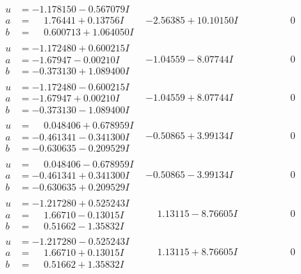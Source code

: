 \documentclass[1p]{elsarticle_modified}
\theoremstyle{definition}
\begin{document}
$$\begin{array}{c|c|c}
\begin{aligned}
u &= -1.178150 - 0.567079 I \\
a &= \phantom{-}1.76441 + 0.13756 I \\
b &= \phantom{-}0.600713 + 1.064050 I\end{aligned}
 & -2.56385 + 10.10150 I & \phantom{-0.000000 } 0 \\ \hline\begin{aligned}
u &= -1.172480 + 0.600215 I \\
a &= -1.67947 - 0.00210 I \\
b &= -0.373130 + 1.089400 I\end{aligned}
 & -1.04559 - 8.07744 I & \phantom{-0.000000 } 0 \\ \hline\begin{aligned}
u &= -1.172480 - 0.600215 I \\
a &= -1.67947 + 0.00210 I \\
b &= -0.373130 - 1.089400 I\end{aligned}
 & -1.04559 + 8.07744 I & \phantom{-0.000000 } 0 \\ \hline\begin{aligned}
u &= \phantom{-}0.048406 + 0.678959 I \\
a &= -0.461341 - 0.341300 I \\
b &= -0.630635 - 0.209529 I\end{aligned}
 & -0.50865 + 3.99134 I & \phantom{-0.000000 } 0 \\ \hline\begin{aligned}
u &= \phantom{-}0.048406 - 0.678959 I \\
a &= -0.461341 + 0.341300 I \\
b &= -0.630635 + 0.209529 I\end{aligned}
 & -0.50865 - 3.99134 I & \phantom{-0.000000 } 0 \\ \hline\begin{aligned}
u &= -1.217280 + 0.525243 I \\
a &= \phantom{-}1.66710 - 0.13015 I \\
b &= \phantom{-}0.51662 - 1.35832 I\end{aligned}
 & \phantom{-}1.13115 - 8.76605 I & \phantom{-0.000000 } 0 \\ \hline\begin{aligned}
u &= -1.217280 - 0.525243 I \\
a &= \phantom{-}1.66710 + 0.13015 I \\
b &= \phantom{-}0.51662 + 1.35832 I\end{aligned}
 & \phantom{-}1.13115 + 8.76605 I & \phantom{-0.000000 } 0 \\ \hline\begin{aligned}

\end{aligned}
\end{array}$$
\end{document}
